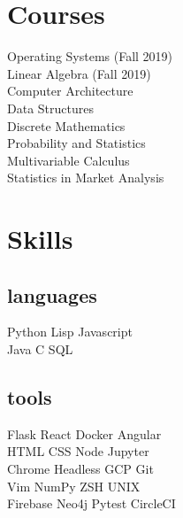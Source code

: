 \documentclass[]{houston-ethan-resume}
\begin{document}
\begin{minipage}[t]{0.33\textwidth}
\section{Courses}
Operating Systems (Fall 2019) \\
Linear Algebra (Fall 2019) \\
Computer Architecture \\
Data Structures \\
Discrete Mathematics \\
Probability and Statistics \\
Multivariable Calculus \\
Statistics in Market Analysis


%
%

\section{Skills}
\subsection{languages}
Python \textbullet{}
Lisp \textbullet{}
Javascript \\
Java \textbullet{}
C \textbullet{}
SQL
\sectionsep

\subsection{tools}
Flask \textbullet{}
React \textbullet{}
Docker \textbullet{}
Angular \\
HTML \textbullet{}
CSS \textbullet{}
Node \textbullet{}
Jupyter \\
Chrome Headless \textbullet{}
GCP \textbullet{}
Git \\
Vim \textbullet{}
NumPy \textbullet{}
ZSH \textbullet{}
UNIX \\
Firebase \textbullet{}
Neo4j  \textbullet{}
Pytest  \textbullet{}
CircleCI

\sectionsep

%
%

\end{minipage}
\hfill
\end{document}

